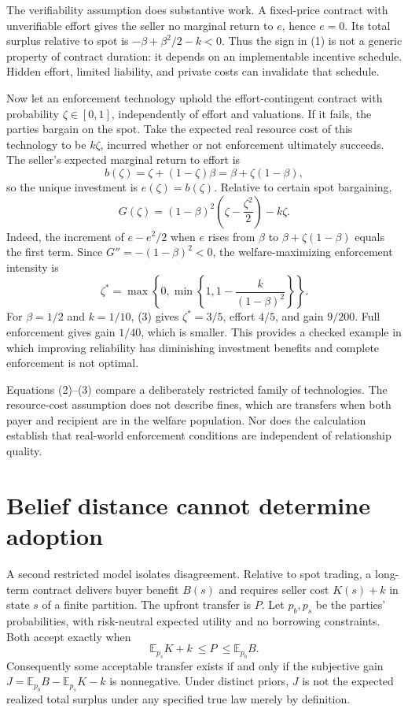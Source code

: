 \documentclass[11pt]{article}
\newcommand{\E}{\mathbb E}
\begin{document}
The verifiability assumption does substantive work. A fixed-price contract with unverifiable effort gives the seller no marginal return to $e$, hence $e=0$. Its total surplus relative to spot is $-\beta+\beta^2/2-k<0$. Thus the sign in (1) is not a generic property of contract duration: it depends on an implementable incentive schedule. Hidden effort, limited liability, and private costs can invalidate that schedule.

Now let an enforcement technology uphold the effort-contingent contract with probability $\zeta\in[0,1]$, independently of effort and valuations. If it fails, the parties bargain on the spot. Take the expected real resource cost of this technology to be $k\zeta$, incurred whether or not enforcement ultimately succeeds. The seller's expected marginal return to effort is
\[
 b(\zeta)=\zeta+(1-\zeta)\beta=\beta+\zeta(1-\beta),
\]
so the unique investment is $e(\zeta)=b(\zeta)$. Relative to certain spot bargaining,
\[
 G(\zeta)=(1-\beta)^2\left(\zeta-\frac{\zeta^2}{2}\right)-k\zeta.
                                                               \tag{2}
\]
Indeed, the increment of $e-e^2/2$ when $e$ rises from $\beta$ to $\beta+\zeta(1-\beta)$ equals the first term. Since $G''=-(1-\beta)^2<0$, the welfare-maximizing enforcement intensity is
\[
 \zeta^*=\max\left\{0,\min\left\{1,1-\frac{k}{(1-\beta)^2}\right\}\right\}.
                                                               \tag{3}
\]
For $\beta=1/2$ and $k=1/10$, (3) gives $\zeta^*=3/5$, effort $4/5$, and gain $9/200$. Full enforcement gives gain $1/40$, which is smaller. This provides a checked example in which improving reliability has diminishing investment benefits and complete enforcement is not optimal.

Equations (2)--(3) compare a deliberately restricted family of technologies. The resource-cost assumption does not describe fines, which are transfers when both payer and recipient are in the welfare population. Nor does the calculation establish that real-world enforcement conditions are independent of relationship quality.

\section*{Belief distance cannot determine adoption}
A second restricted model isolates disagreement. Relative to spot trading, a long-term contract delivers buyer benefit $B(s)$ and requires seller cost $K(s)+k$ in state $s$ of a finite partition. The upfront transfer is $P$. Let $p_b,p_s$ be the parties' probabilities, with risk-neutral expected utility and no borrowing constraints. Both accept exactly when
\[
 \E_{p_s}K+k\ \leq P\ \leq \E_{p_b}B.                       \tag{4}
\]
Consequently some acceptable transfer exists if and only if the subjective gain
$J=\E_{p_b}B-\E_{p_s}K-k$ is nonnegative. Under distinct priors, $J$ is not the expected realized total surplus under any specified true law merely by definition.
\end{document}
